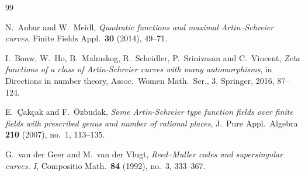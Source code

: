 \documentclass[12pt,a4paper]{amsart}
\theoremstyle{definition}
\theoremstyle{remark}
\begin{document}
\begin{thebibliography}{99}


N.\ Anbar and W.\ Meidl, \textit{Quadratic functions and maximal Artin--Schreier curves}, Finite Fields
Appl.\ \textbf{30}  (2014), 49--71. 



I.\ Bouw, W.\ Ho, B.\ Malmskog, R.\ Scheidler, P.\ 
Srinivasan and C.\ Vincent,
\textit{Zeta functions of a class of Artin-Schreier curves with many automorphisms},
in Directions in number theory, Assoc.\ Women Math.\ Ser., 3, Springer, 2016, 87--124.





E.\ \c Cak\c cak and F.\ \"Ozbudak,
\textit{Some Artin-Schreier type function fields over finite fields with prescribed genus and number of rational places},
J.\ Pure Appl.\ Algebra \textbf{210} (2007), no.~1, 113--135.







G.\ van der Geer and M.\ van der Vlugt,
\textit{Reed--Muller codes and supersingular curves. I},
Compositio Math.\ \textbf{84} (1992), no.~3, 333--367.


\end{thebibliography}
\end{document}
